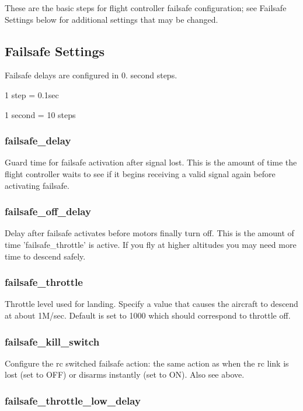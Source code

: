 These are the basic steps for flight controller failsafe configuration; see Failsafe Settings below for additional settings that may be changed.

\subsection*{Failsafe Settings}

Failsafe delays are configured in 0. second steps.

1 step = 0.\+1sec

1 second = 10 steps

\subsubsection*{{\ttfamily failsafe\+\_\+delay}}

Guard time for failsafe activation after signal lost. This is the amount of time the flight controller waits to see if it begins receiving a valid signal again before activating failsafe.

\subsubsection*{{\ttfamily failsafe\+\_\+off\+\_\+delay}}

Delay after failsafe activates before motors finally turn off. This is the amount of time 'failsafe\+\_\+throttle' is active. If you fly at higher altitudes you may need more time to descend safely.

\subsubsection*{{\ttfamily failsafe\+\_\+throttle}}

Throttle level used for landing. Specify a value that causes the aircraft to descend at about 1\+M/sec. Default is set to 1000 which should correspond to throttle off.

\subsubsection*{{\ttfamily failsafe\+\_\+kill\+\_\+switch}}

Configure the rc switched failsafe action\+: the same action as when the rc link is lost (set to O\+F\+F) or disarms instantly (set to O\+N). Also see above.

\subsubsection*{{\ttfamily failsafe\+\_\+throttle\+\_\+low\+\_\+delay}}


